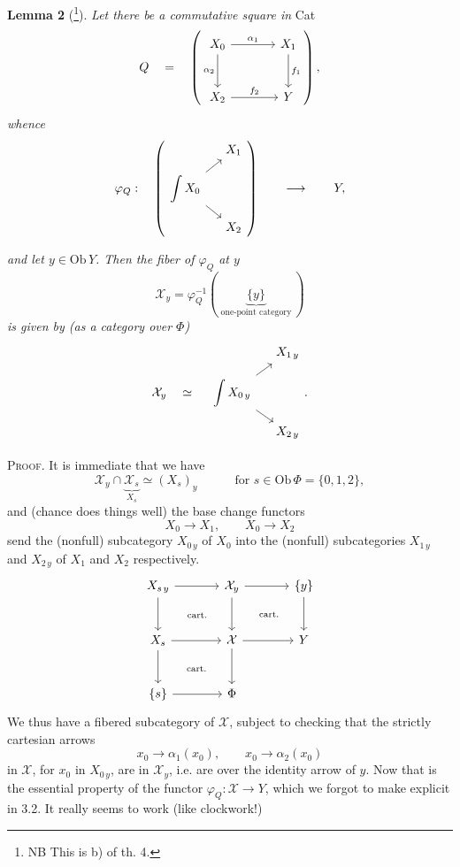 \documentclass[11pt]{article}
\newcommand{\printedpage}[1]{\marginpar{\footnotesize p.~#1}}
\newcommand{\msp}[1]{\marginpar{\footnotesize [#1]}}
\newcommand{\intdiag}[3]{\begin{tikzcd}[row sep=small,column sep=small,ampersand replacement=\&,baseline=(\tikzcdmatrixname-2-1.base)]
 \& #2 \\
 \displaystyle\int #1 \arrow[ur] \arrow[dr] \& \\
 \& #3
\end{tikzcd}}
\begin{document}
\noindent\textbf{Lemma 2} (\footnote[106]{NB This is b) of th. 4.}). \textit{Let there be a commutative square in} Cat
\[
Q \quad = \quad
\left(
\begin{tikzcd}[row sep=large,column sep=large]
X_0 \arrow[r, "\alpha_1"] \arrow[d, "\alpha_2"'] & X_1 \arrow[d, "f_1"] \\
X_2 \arrow[r, "f_2"] & Y
\end{tikzcd}
\right),
\]
\textit{whence}
\[
\varphi_Q : \quad \left( \intdiag{X_0}{X_1}{X_2} \right) \qquad\longrightarrow\qquad Y,
\]

\msp{page 155}
\textit{and let $y\in\mathrm{Ob}\,Y$. Then the fiber of $\varphi_Q$ at $y$}
\[
\mathcal{X}_y = \varphi_Q^{-1}(\ \underbrace{\{y\}}_{\text{one-point category}}\ )
\]
\textit{is given by (as a category over $\Phi$)}
\[
\mathcal{X}_y \quad\simeq\quad \intdiag{X_{0\,y}}{X_{1\,y}}{X_{2\,y}} .
\]

\noindent\textsc{Proof.} It is immediate that we have
\[
\mathcal{X}_y\cap\underbrace{\mathcal{X}_s}_{X_s}\simeq(X_s)_y \qquad\quad \text{for } s\in\mathrm{Ob}\,\Phi=\{0,1,2\},
\]
\printedpage{107}
and (chance does things well) the base change functors
\[
X_0\longrightarrow X_1, \qquad X_0\longrightarrow X_2
\]
send the (nonfull) subcategory $X_{0\,y}$ of $X_0$ into the (nonfull) subcategories $X_{1\,y}$ and $X_{2\,y}$ of $X_1$ and $X_2$ respectively.
\[
\begin{tikzcd}[row sep=large,column sep=large]
X_{s\,y} \arrow[r] \arrow[d] \arrow[dr, phantom, "\scriptstyle\text{cart.}"] & \mathcal{X}_y \arrow[r] \arrow[d] \arrow[dr, phantom, "\scriptstyle\text{cart.}"] & \{y\} \arrow[d] \\
X_s \arrow[r] \arrow[d] \arrow[dr, phantom, "\scriptstyle\text{cart.}"] & \mathcal{X} \arrow[r] \arrow[d] & Y \\
\{s\} \arrow[r] & \Phi &
\end{tikzcd}
\]
We thus have a fibered subcategory of $\mathcal{X}$, subject to checking that the strictly cartesian arrows
\[
x_0\longrightarrow\alpha_1(x_0), \qquad x_0\longrightarrow\alpha_2(x_0)
\]
in $\mathcal{X}$, for $x_0$ in $X_{0\,y}$, are in $\mathcal{X}_y$, i.e. are over the identity arrow of $y$. Now that is the essential property
\msp{page 156}
of the functor $\varphi_Q : \mathcal{X}\longrightarrow Y$, which we forgot to make explicit in 3.2. It really seems to work (like clockwork!)
\end{document}
